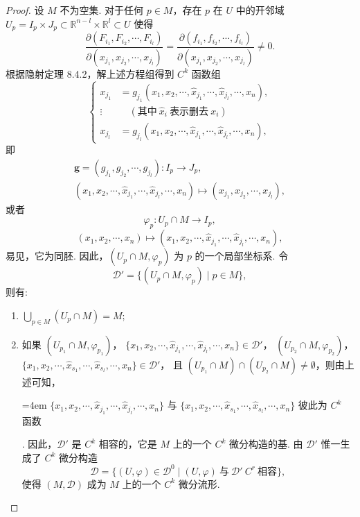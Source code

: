 \begin{proof}
设 $M$ 不为空集. 对于任何 $p \in M$，存在 $p$ 在 $U$ 中的开邻域 $U_{p} = I_{p} \times J_{p} \subset \mathbb{R}^{n-l} \times \mathbb{R}^{l} \subset U$ 使得
\[
  \frac{\partial(F_{i_{1}},F_{i_{2}},\cdots,F_{i_{l}})}{\partial(x_{j_{1}},x_{j_{2}},\cdots,x_{j_{l}})} = \frac{\partial(f_{i_{1}},f_{i_{2}},\cdots,f_{i_{l}})}{\partial(x_{j_{1}},x_{j_{2}},\cdots,x_{j_{l}})} \neq 0.
\]
根据隐射定理 8.4.2，解上述方程组得到 $C^{k}$ 函数组
\[
  \left\{\begin{aligned}
    x_{j_{1}} &= g_{j_{1}}(x_{1},x_{2},\cdots,\hat{x}_{j_{1}},\cdots,\hat{x}_{j_{l}},\cdots,x_{n}), \\
    \vdots & \quad (\text{其中}\ \hat{x}_{i}\ \text{表示删去}\ x_{i}) \\
    x_{j_{l}} &= g_{j_{l}}(x_{1},x_{2},\cdots,\hat{x}_{j_{1}},\cdots,\hat{x}_{j_{l}},\cdots,x_{n}),
  \end{aligned}\right.
\]
即
\[
  \begin{array}{c}
    \boldsymbol{g} = (g_{j_{1}},g_{j_{2}},\cdots,g_{j_{l}}): I_{p} \to J_{p}, \\
    (x_{1},x_{2},\cdots,\hat{x}_{j_{1}},\cdots,\hat{x}_{j_{l}},\cdots,x_{n}) \mapsto (x_{j_{1}},x_{j_{2}},\cdots,x_{j_{l}}),
  \end{array}
\]
或者
\[
  \varphi_{p}: U_{p} \cap M \to I_{p},
\]
\[
  (x_{1},x_{2},\cdots,x_{n}) \mapsto (x_{1},x_{2},\cdots,\hat{x}_{j_{1}},\cdots,\hat{x}_{j_{l}},\cdots,x_{n}),
\]
易见，它为同胚. 因此，$(U_{p} \cap M,\varphi_{p})$ 为 $p$ 的一个局部坐标系. 令
\[
  \mathcal{D}' = \bigl\{(U_{p} \cap M,\varphi_{p}) \mid p \in M\bigr\},
\]
则有:
\begin{enumerate}
\item[(1)] $\displaystyle\bigcup_{p \in M}(U_{p} \cap M) = M$;
\item[(2)] 如果 $(U_{p_{1}} \cap M,\varphi_{p_{1}})$，
$\{x_{1},x_{2},\cdots,\hat{x}_{j_{1}},\cdots,\hat{x}_{j_{l}},\cdots,x_{n}\} \in \mathcal{D}'$，
$(U_{p_{2}} \cap M,\varphi_{p_{2}})$，
$\{x_{1},x_{2},\cdots,\hat{x}_{s_{1}},\cdots,\hat{x}_{s_{l}},\cdots,x_{n}\} \in \mathcal{D}'$，
且 $(U_{p_{1}} \cap M) \cap (U_{p_{2}} \cap M) \neq \emptyset$，则由上述可知，
{\emergencystretch=4em $\{x_{1},x_{2},\cdots,\hat{x}_{j_{1}},\cdots,\hat{x}_{j_{l}},\cdots,x_{n}\}$ 与 $\{x_{1},x_{2},\cdots,\hat{x}_{s_{1}},\cdots,\hat{x}_{s_{l}},\cdots,x_{n}\}$ 彼此为 $C^{k}$ 函数\par}. 因此，$\mathcal{D}'$ 是 $C^{k}$ 相容的，它是 $M$ 上的一个 $C^{k}$ 微分构造的基. 由 $\mathcal{D}'$ 惟一生成了 $C^{k}$ 微分构造
\[
  \mathcal{D} = \bigl\{(U,\varphi) \in \mathcal{D}^{0} \mid (U,\varphi)\ \text{与}\ \mathcal{D}'\ C^{r}\ \text{相容}\bigr\},
\]
使得 $(M,\mathcal{D})$ 成为 $M$ 上的一个 $C^{k}$ 微分流形.
\end{enumerate}
\end{proof}

